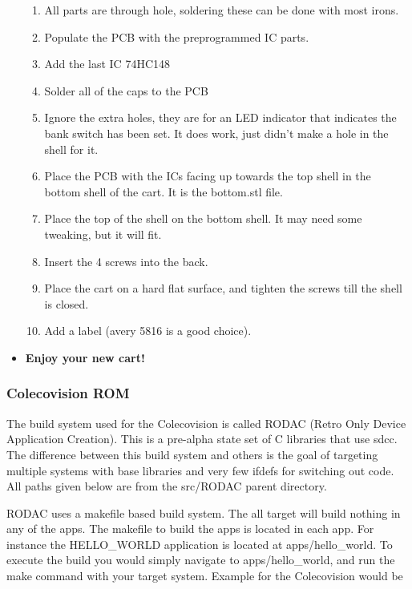 \documentclass{article}
\begin{document}
\begin{itemize}
\begin{enumerate}
        \item All parts are through hole, soldering these can be done with most irons.
        \item Populate the PCB with the preprogrammed IC parts.
        \item Add the last IC 74HC148
        \item Solder all of the caps to the PCB
        \item Ignore the extra holes, they are for an LED indicator that indicates the bank switch has been set. It does work, just didn't make a hole in the shell for it.
        \item Place the PCB with the ICs facing up towards the top shell in the bottom shell of the cart. It is the bottom.stl file.
        \item Place the top of the shell on the bottom shell. It may need some tweaking, but it will fit.
        \item Insert the 4 screws into the back.
        \item Place the cart on a hard flat surface, and tighten the screws till the shell is closed.
        \item Add a label (avery 5816 is a good choice).
      \end{enumerate}
    \item \textbf{Enjoy your new cart!}
  \end{itemize}

  \subsubsection{Colecovision ROM}

  \par
  The build system used for the Colecovision is called RODAC (Retro Only Device Application Creation). This is a pre-alpha state set of C libraries that use sdcc.
  The difference between this build system and others is the goal of targeting multiple systems with base libraries and very few ifdefs for switching out code.
  All paths given below are from the src/RODAC parent directory.
  \par
  RODAC uses a makefile based build system. The all target will build nothing in any of the apps. The makefile to build the apps is located in each app. For instance
  the HELLO\_WORLD application is located at apps/hello\_world. To execute the build you would simply navigate to apps/hello\_world, and run the make command with
  your target system. Example for the Colecovision would be
\end{document}
